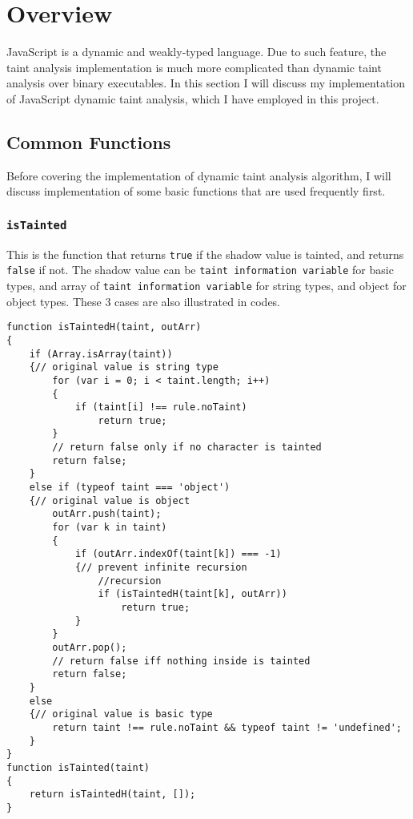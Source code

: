 \section{Overview}

JavaScript is a dynamic and weakly-typed language. Due to such feature, the taint analysis implementation is much more complicated than dynamic taint analysis over binary executables. In this section I will discuss my implementation of JavaScript dynamic taint analysis, which I have employed in this project. 

\subsection{Common Functions}

Before covering the implementation of dynamic taint analysis algorithm, I will discuss implementation of some basic functions that are used frequently first.

\subsubsection{\texttt{isTainted}}

This is the function that returns \texttt{true} if the shadow value is tainted, and returns \texttt{false} if not. The shadow value can be \texttt{taint information variable} for basic types, and array of \texttt{taint information variable} for string types, and object for object types. These 3 cases are also illustrated in codes.

\begin{verbatim}
function isTaintedH(taint, outArr)
{
    if (Array.isArray(taint))
    {// original value is string type
        for (var i = 0; i < taint.length; i++)
        {
            if (taint[i] !== rule.noTaint)
                return true;
        }
        // return false only if no character is tainted
        return false;
    }
    else if (typeof taint === 'object')
    {// original value is object
        outArr.push(taint);
        for (var k in taint)
        {
            if (outArr.indexOf(taint[k]) === -1)
            {// prevent infinite recursion
                //recursion
                if (isTaintedH(taint[k], outArr))
                    return true;
            }
        }
        outArr.pop();
        // return false iff nothing inside is tainted
        return false;
    }
    else
    {// original value is basic type
        return taint !== rule.noTaint && typeof taint != 'undefined';
    }
}
function isTainted(taint)
{
    return isTaintedH(taint, []);
}
\end{verbatim}

